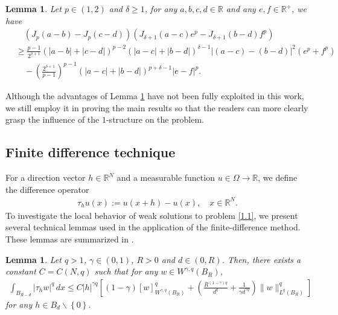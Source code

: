 \documentclass[reqno,10pt]{amsart}
\numberwithin{equation}{section}
\newtheorem{lemma}[theorem]{Lemma}
\begin{document}
\begin{lemma}
	\label{lem3}
	Let $p\in(1,2)$ and $\delta\ge1$, for any $a,b,c,d\in\mathbb{R}$ and any $e,f\in \mathbb{R}^+$, we have
	\begin{align*}
		&\quad\left( J_p(a-b)-J_p(c-d)\right)\left( J_{\delta+1}(a-c)e^p-J_{\delta+1}(b-d)f^p\right)\\
		&\ge \frac{p-1}{2^{\delta+1}}\left( |a-b|+|c-d|\right)^{p-2}\left( |a-c|+|b-d|\right)^{\delta-1}\left| (a-c)-(b-d)\right|^2\left( e^p+f^p\right)\\
		&\quad -\left( \frac{2^{\delta+1}}{p-1}\right)^{p-1}\left( |a-c|+|b-d|\right)^{p+\delta-1}|e-f|^p . 
	\end{align*}
\end{lemma}

Although the advantages of Lemma \ref{lem3} have not been fully exploited in this work, we still employ it in proving the main results so that the readers can more clearly grasp the influence of the $1$-structure on the problem.

\subsection{Finite difference technique}
For a direction vector $h\in \mathbb R^N$ and a measurable function $u\in \Omega\to \mathbb R$, we define the difference operator 
\begin{align*}
	\tau_hu(x):=u(x+h)-u(x), \quad x\in\mathbb{R}^N.
\end{align*}
To investigate the local behavior of weak solutions to problem \eqref{1.1}, we present several technical lemmas used in the application of the finite-difference method. These lemmas are summarized in \cite{GT83, BL17, DKLN23, D04,LZ25}.
\begin{lemma} 
	\label{lem5}
	Let $q>1$, $\gamma\in (0,1)$, $R>0$ and $d\in (0,R)$. Then, there exists a constant $C=C(N,q)$ such that for any $w\in W^{\gamma,q}(B_R)$,
	\begin{align*}
		\int_{B_{R-d}}|\tau_hw|^q\,dx\le C|h|^{\gamma q}\left[ (1-\gamma)[w]^q_{W^{\gamma,q}(B_R)}+\left( \frac{R^{(1-\gamma)q}}{d^q}+\frac{1}{\gamma d^{\gamma q}}\right)\|w\|^q_{L^q(B_R)} \right] 
	\end{align*}
	for any $h\in B_d\backslash \left\lbrace 0\right\rbrace$.
\end{lemma}
\end{document}
